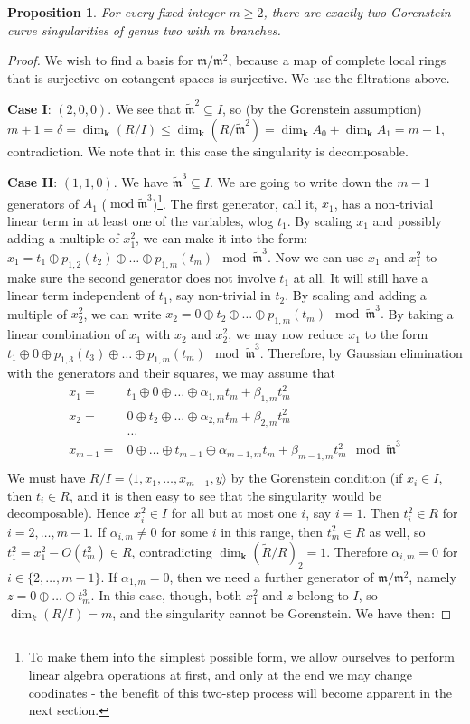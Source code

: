 \documentclass[11pt]{amsart}
\renewcommand{\k}{\mathbf k}
\newcommand{\m}{\mathfrak m}
\newcommand{\tR}{\widetilde{R}}
\newcommand{\tm}{\widetilde{\mathfrak m}}
\theoremstyle{plain}
\newtheorem{prop}[thm]{Proposition}
\theoremstyle{definition}
\begin{document}
\begin{prop}\label{prop:classification}
 For every fixed integer $m\geq 2$, there are exactly two Gorenstein curve singularities of genus two with $m$ branches.
\end{prop}
\begin{proof}
 We wish to find a basis for $\m/\m^2$, because a map of complete local rings that is surjective on cotangent spaces is surjective. We use the filtrations above.
 
 \textbf{Case I}: $(2,0,0)$. We see that $\tm^2\subseteq I$, so (by the Gorenstein assumption) $m+1=\delta=\dim_\k(R/I)\leq \dim_\k(R/\tm^2)=\dim_\k A_0+\dim_\k A_1=m-1$, contradiction. We note that in this case the singularity is decomposable.
 
 \textbf{Case II}: $(1,1,0)$. We have $\tm^3\subseteq I$. We are going to write down the $m-1$ generators of $A_1$ ($\operatorname{mod} \tm^3$)\footnote{To make them into the simplest possible form, we allow ourselves to perform linear algebra operations at first, and only at the end we may change coodinates - the benefit of this two-step process will become apparent in the next section.}. The first generator, call it, $x_1$, has a non-trivial linear term in at least one of the variables, wlog $t_1$. By scaling $x_1$ and possibly adding a multiple of $x_1^2$, we can make it into the form:
 $x_1=t_1\oplus p_{1,2}(t_2)\oplus\ldots\oplus p_{1,m}(t_m) \mod\tm^3.$ Now we can use $x_1$ and $x_1^2$ to make sure the second generator does not involve $t_1$ at all. It will still have a linear term independent of $t_1$, say non-trivial in $t_2$. By scaling and adding a multiple of $x_2^2$, we can write $x_2=0\oplus t_2\oplus\ldots\oplus p_{1,m}(t_m) \mod\tm^3.$ By taking a linear combination of $x_1$ with $x_2$ and $x_2^2$, we may now reduce $x_1$ to the form $t_1\oplus0\oplus p_{1,3}(t_3)\oplus\ldots\oplus p_{1,m}(t_m)\mod\tm^3$. Therefore, by Gaussian elimination with the generators and their squares, we may assume that
 \begin{align*}
  x_1= & t_1\oplus0\oplus\ldots\oplus\alpha_{1,m}t_m+\beta_{1,m}t_m^2\\
  x_2= & 0\oplus t_2\oplus\ldots\oplus\alpha_{2,m}t_m+\beta_{2,m}t_m^2\\
  &\ldots\\
  x_{m-1}= & 0\oplus\ldots\oplus t_{m-1}\oplus\alpha_{m-1,m}t_m+\beta_{m-1,m}t_m^2 \mod \tm^3\\
 \end{align*}
 We must have $R/I=\langle 1,x_1,\ldots,x_{m-1},y\rangle$ by the Gorenstein condition (if $x_i\in I$, then $t_i\in R$, and it is then easy to see that the singularity would be decomposable). Hence $x_i^2\in I$ for all but at most one $i$, say $i=1$. Then $t_i^2\in R$ for $i=2,\ldots,m-1$. If $\alpha_{i,m}\neq 0$ for some $i$ in this range, then $t_m^2\in R$ as well, so $t_1^2=x_1^2-O(t_m^2)\in R$, contradicting $\dim_\k(\tR/R)_2=1$. Therefore $\alpha_{i,m}=0$ for $i\in\{2,\ldots,m-1\}$. If $\alpha_{1,m}=0$, then we need a further generator of $\m/\m^2$, namely $z=0\oplus\ldots\oplus t_m^3$. In this case, though, both $x_1^2$ and $z$ belong to $I$, so $\dim_k(R/I)=m$, and the singularity cannot be Gorenstein. We have then:

\end{proof}
\end{document}
